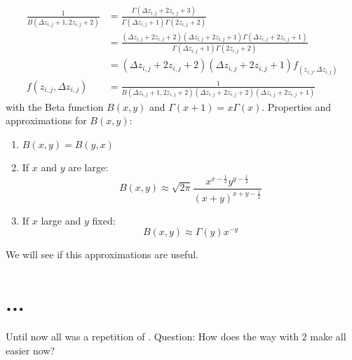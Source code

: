 \begin{equation}\begin{split}
	\frac{1}{B\left(\Delta z_{i,j} + 1, 2z_{i,j} + 2\right)} & = \frac{\Gamma\left(\Delta z_{i,j} + 2z_{i,j} + 3\right)}{\Gamma\left(\Delta z_{i,j} + 1\right)\Gamma\left(2z_{i,j} + 2\right)} \\
	& = \frac{\left(\Delta z_{i,j} + 2z_{i,j} + 2\right)\left(\Delta z_{i,j} + 2z_{i,j} + 1\right) \Gamma\left(\Delta z_{i,j} + 2z_{i,j} + 1\right)}{\Gamma\left(\Delta z_{i,j} + 1\right)\Gamma\left(2z_{i,j} + 2\right)} \\
	& = \left(\Delta z_{i,j} + 2z_{i,j} + 2\right)\left(\Delta z_{i,j} + 2z_{i,j} + 1\right) f_{\left(z_{i,j}, \Delta z_{i,j}\right)} \\
	f\left(z_{i,j}, \Delta z_{i,j}\right) & = \frac{1}{B\left(\Delta z_{i,j} + 1, 2z_{i,j} + 2\right)\left(\Delta z_{i,j} + 2z_{i,j} + 2\right)\left(\Delta z_{i,j} + 2z_{i,j} + 1\right)}
\end{split}\label{eq:gammafunczsolV1}\end{equation} 
with the Beta function $B\left(x,y\right)$ and $\Gamma\left(x+1\right) = x\Gamma\left(x\right)$. Properties and approximations for $B\left(x,y\right)$:
\begin{enumerate}
	\item $B\left(x,y\right) = B\left(y,x\right)$
	\item If $x$ and $y$ are large:
		\[ B(x,y) \approx \sqrt{2\pi} \frac{x^{x - \frac{1}{2}}y^{y - \frac{1}{2}}}{\left(x + y\right)^{x + y - \frac{1}{2}}} \]
	\item If $x$ large and $y$ fixed:
		\[ B(x,y) \approx \Gamma\left(y\right) x^{-y} \]
\label{en:propBetafunction}\end{enumerate}
We will see if this approximations are useful.
\section{...}
\label{s:...}
Until now all was a repetition of \cite{2014arXiv1411.2824Z}. Question: How does the way with $2$ make all easier now?









\nocite{*}
\newpage
%



